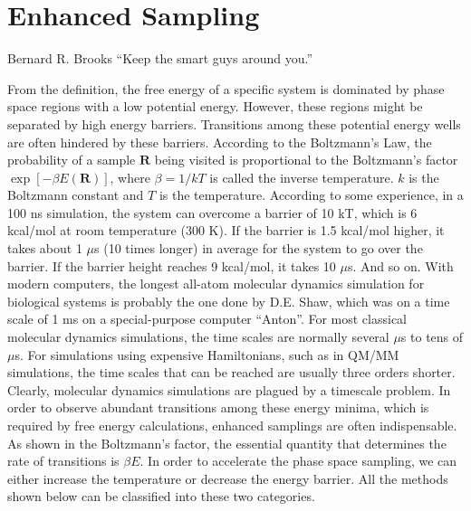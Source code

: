 \chapter{Enhanced Sampling\label{chapter:ES}}
\begin{chapquote}{Bernard R. Brooks%
	}
	``Keep the smart guys around you.''
\end{chapquote}
From the definition, the free energy of a specific system is dominated by phase space regions with a low potential energy. However, these regions might be separated by high energy barriers. Transitions among these potential energy wells are often hindered by these barriers. According to the Boltzmann's Law, the probability of a sample $\mathbf{R}$ being visited is proportional to the Boltzmann's factor $\exp{\left[-\beta E(\mathbf{R})\right]}$, where $\beta=1/kT$ is called the inverse temperature. $k$ is the Boltzmann constant and $T$ is the temperature. According to some experience, in a 100 ns simulation, the system can overcome a barrier of 10 kT, which is 6 kcal/mol at room temperature (300 K). If the barrier is 1.5 kcal/mol higher, it takes about 1 $\mu$s (10 times longer) in average for the system to go over the barrier. If the barrier height reaches 9 kcal/mol, it takes 10 $\mu$s. And so on. With modern computers, the longest all-atom molecular dynamics simulation for biological systems is probably the one done by D.E. Shaw, which was on a time scale of 1 ms on a special-purpose computer ``Anton''. For most classical molecular dynamics simulations, the time scales are normally several $\mu$s to tens of $\mu$s. For simulations using expensive Hamiltonians, such as in QM/MM simulations, the time scales that can be reached are usually three orders shorter. Clearly, molecular dynamics simulations are plagued by a timescale problem. In order to observe abundant transitions among these energy minima, which is required by free energy calculations, enhanced samplings are often indispensable. As shown in the Boltzmann's factor, the essential quantity that determines the rate of transitions is $\beta E$. In order to accelerate the phase space sampling, we can either increase the temperature or decrease the energy barrier. All the methods shown below can be classified into these two categories. 
\clearpage 

\clearpage 

\clearpage

\clearpage 

\clearpage 

\clearpage 

\clearpage

%
\clearpage

